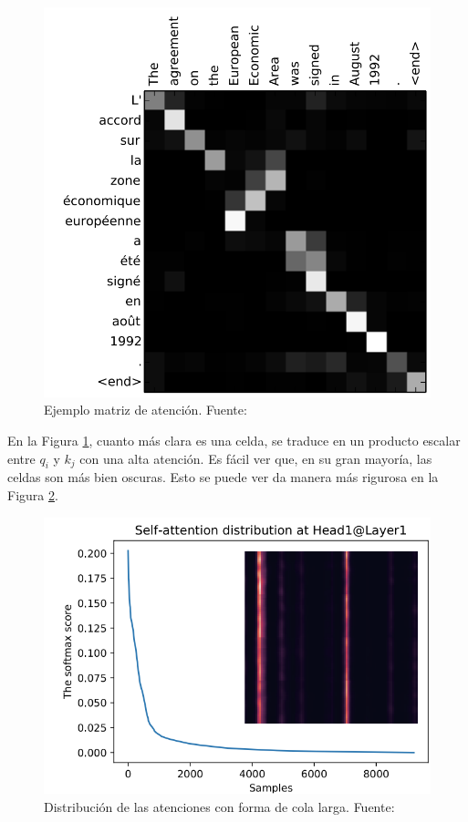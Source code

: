 \begin{figure}[H]
    \centering
    \includegraphics[scale = 0.4]{imgs/aten_mat.png}
    \caption{Ejemplo matriz de atención. \scriptsize{Fuente: \parencite{rnnPlusAttention}}}
    \label{aten_mat}
\end{figure}

En la Figura \ref{aten_mat}, cuanto más clara es una celda, se traduce en un producto escalar entre $q_i$ y $k_j$ con una alta atención. Es fácil ver que, en su gran mayoría, las celdas son más bien oscuras. Esto se puede ver da manera más rigurosa en la Figura \ref{long_tail_dist}.

\begin{figure}[H]
    \centering
    \includegraphics[scale = 0.6]{imgs/long_tail_dist.png}
    \caption{Distribución de las atenciones con forma de cola larga. \scriptsize{Fuente: \parencite{informer}}}
    \label{long_tail_dist}
\end{figure}

